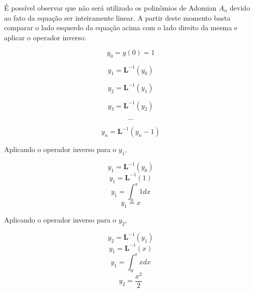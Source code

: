 É possível observar que não será utilizado os polinômios de Adomian $A_{n}$  devido ao fato da equação ser inteiramente linear.
A partir deste momento basta comparar o lado esquerdo da equação acima com o lado direito da mesma e aplicar o operador inverso:

\begin{equation*}
  y_{0} = y(0) = 1
\end{equation*}

\begin{equation*}
  y_{1} = \textbf{L}^{-1} (y_{0})
\end{equation*}

\begin{equation*}
  y_{2} = \textbf{L}^{-1} (y_{1})
\end{equation*}

\begin{equation*}
  y_{3} = \textbf{L}^{-1} (y_{2})
\end{equation*}

\begin{equation*}
  ...
\end{equation*}

 \begin{equation*}
  y_{n} = \textbf{L}^{-1} (y_{n} - 1)
\end{equation*}

Aplicando o operador inverso para o $y_{1}$, 

\begin{equation*}
  y_{1} = \textbf{L}^{-1} (y_{0})
\end{equation*}
\begin{equation*}
  y_{1} = \textbf{L}^{-1}(1)
\end{equation*}
\begin{equation*}
  y_{1} =\int_0^{x} 1dx
\end{equation*}
\begin{equation*}
  y_{1} = x
\end{equation*}

Aplicando o operador inverso para o $y_{2}$,

\begin{equation*}
  y_{2} = \textbf{L}^{-1} (y_{1})
\end{equation*}
\begin{equation*}
  y_{1} = \textbf{L}^{-1}(x)
\end{equation*}
\begin{equation*}
  y_{1} =\int_0^{x} xdx
\end{equation*}
\begin{equation*}
  y_{2} = \frac{x^{2}}{2}
\end{equation*}

